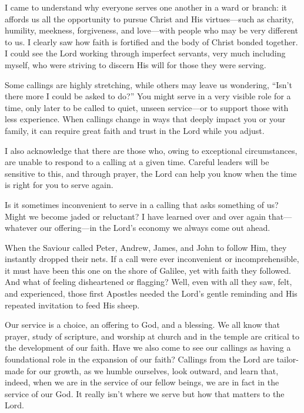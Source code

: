 \documentclass[letterpaper, 11pt]{report}
\begin{document}
I came to understand why everyone serves one another in a ward or branch: it affords us all the opportunity to pursue Christ and His virtues—such as charity, humility, meekness, forgiveness, and love—with people who may be very different to us. I clearly saw how faith is fortified and the body of Christ bonded together. I could see the Lord working through imperfect servants, very much including myself, who were striving to discern His will for those they were serving.

Some callings are highly stretching, while others may leave us wondering, “Isn’t there more I could be asked to do?” You might serve in a very visible role for a time, only later to be called to quiet, unseen service—or to support those with less experience. When callings change in ways that deeply impact you or your family, it can require great faith and trust in the Lord while you adjust.

I also acknowledge that there are those who, owing to exceptional circumstances, are unable to respond to a calling at a given time. Careful leaders will be sensitive to this, and through prayer, the Lord can help you know when the time is right for you to serve again.

Is it sometimes inconvenient to serve in a calling that asks something of us? Might we become jaded or reluctant? I have learned over and over again that—whatever our offering—in the Lord’s economy we always come out ahead.

When the Saviour called Peter, Andrew, James, and John to follow Him, they instantly dropped their nets. If a call were ever inconvenient or incomprehensible, it must have been this one on the shore of Galilee, yet with faith they followed. And what of feeling disheartened or flagging? Well, even with all they saw, felt, and experienced, those first Apostles needed the Lord’s gentle reminding and His repeated invitation to feed His sheep.

Our service is a choice, an offering to God, and a blessing. We all know that prayer, study of scripture, and worship at church and in the temple are critical to the development of our faith. Have we also come to see our callings as having a foundational role in the expansion of our faith? Callings from the Lord are tailor-made for our growth, as we humble ourselves, look outward, and learn that, indeed, when we are in the service of our fellow beings, we are in fact in the service of our God. It really isn’t where we serve but how that matters to the Lord.
\end{document}
